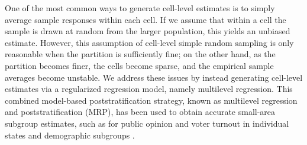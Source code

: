 \documentclass[preprint,authoryear,12pt]{elsarticle}
\begin{document}
One of the most common ways to generate cell-level estimates is to simply average sample responses within each cell.
If we assume that within a cell the sample is drawn at random from the larger population, this yields an unbiased estimate.
However, this assumption of cell-level simple random sampling is only reasonable when
the partition is sufficiently fine; on the other hand, as the partition becomes finer,
the cells become sparse, and the empirical sample averages become unstable.
We address these issues by instead generating cell-level estimates via a regularized regression model, namely
multilevel regression.
This combined model-based poststratification strategy,
known as multilevel regression and poststratification (MRP), has been used to
obtain accurate small-area subgroup estimates, such as for public opinion and voter turnout in individual states and demographic subgroups \citep{park2004bayesian, lax_2009, ghitza_2013}.
\end{document}
